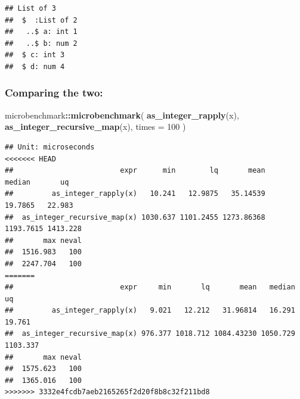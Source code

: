 \documentclass[]{book}
\newenvironment{Shaded}{\begin{snugshade}}{\end{snugshade}}
\newcommand{\CharTok}[1]{\textcolor[rgb]{0.31,0.60,0.02}{#1}}
\newcommand{\ControlFlowTok}[1]{\textcolor[rgb]{0.13,0.29,0.53}{\textbf{#1}}}
\newcommand{\DataTypeTok}[1]{\textcolor[rgb]{0.13,0.29,0.53}{#1}}
\newcommand{\DecValTok}[1]{\textcolor[rgb]{0.00,0.00,0.81}{#1}}
\newcommand{\KeywordTok}[1]{\textcolor[rgb]{0.13,0.29,0.53}{\textbf{#1}}}
\newcommand{\NormalTok}[1]{#1}
\newcommand{\OperatorTok}[1]{\textcolor[rgb]{0.81,0.36,0.00}{\textbf{#1}}}
\newcommand{\StringTok}[1]{\textcolor[rgb]{0.31,0.60,0.02}{#1}}
\begin{document}
\begin{verbatim}
## List of 3
##  $  :List of 2
##   ..$ a: int 1
##   ..$ b: num 2
##  $ c: int 3
##  $ d: num 4
\end{verbatim}

\hypertarget{comparing-the-two}{%
\subsubsection{Comparing the two:}\label{comparing-the-two}}

\begin{Shaded}
\begin{Highlighting}[]
\NormalTok{microbenchmark}\OperatorTok{::}\KeywordTok{microbenchmark}\NormalTok{(}
  \KeywordTok{as_integer_rapply}\NormalTok{(x),}
  \KeywordTok{as_integer_recursive_map}\NormalTok{(x),}
  \DataTypeTok{times =} \DecValTok{100}
\NormalTok{)}
\end{Highlighting}
\end{Shaded}

\begin{verbatim}
## Unit: microseconds
<<<<<<< HEAD
##                         expr      min        lq       mean    median       uq
##         as_integer_rapply(x)   10.241   12.9875   35.14539   19.7865   22.983
##  as_integer_recursive_map(x) 1030.637 1101.2455 1273.86368 1193.7615 1413.228
##       max neval
##  1516.983   100
##  2247.704   100
=======
##                         expr     min       lq       mean   median       uq
##         as_integer_rapply(x)   9.021   12.212   31.96814   16.291   19.761
##  as_integer_recursive_map(x) 976.377 1018.712 1084.43230 1050.729 1103.337
##       max neval
##  1575.623   100
##  1365.016   100
>>>>>>> 3332e4fcdb7aeb2165265f2d20f8b8c32f211bd8
\end{verbatim}

\begin{Shaded}
\end{Shaded}
\end{document}
